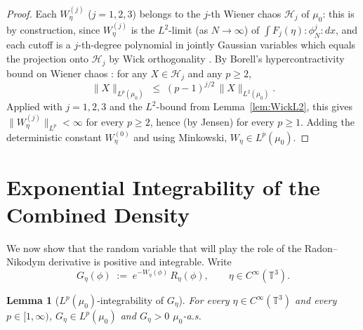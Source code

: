 \documentclass[12pt]{article}
\newtheorem{lemma}[theorem]{Lemma}
\theoremstyle{definition}
\begin{document}
\begin{proof}
Each $W_\eta^{(j)}$ ($j=1,2,3$) belongs to the $j$-th Wiener chaos $\mathcal{H}_j$ of
$\mu_0$: this is by construction, since $W_\eta^{(j)}$ is the $L^2$-limit (as $N\to\infty$)
of $\int F_j(\eta)\colon\!\phi_N^j\!\colon dx$, and each cutoff is a $j$-th-degree
polynomial in jointly Gaussian variables which equals the projection onto $\mathcal{H}_j$
by Wick orthogonality \cite[Ch.~I]{Simon}. By Borell's hypercontractivity bound on Wiener
chaos \cite{Borell}: for any $X\in\mathcal{H}_j$ and any $p\ge 2$,
\begin{equation}\label{eq:Borell}
\|X\|_{L^p(\mu_0)}\;\le\;(p-1)^{j/2}\,\|X\|_{L^2(\mu_0)}.
\end{equation}
Applied with $j=1,2,3$ and the $L^2$-bound from Lemma~\ref{lem:WickL2}, this gives
$\|W_\eta^{(j)}\|_{L^p}<\infty$ for every $p\ge 2$, hence (by Jensen) for every $p\ge 1$.
Adding the deterministic constant $W_\eta^{(0)}$ and using Minkowski,
$W_\eta\in L^p(\mu_0)$.
\end{proof}

\section{Exponential Integrability of the Combined Density}

We now show that the random variable that will play the role of the Radon--Nikodym
derivative is positive and integrable. Write
\begin{equation}\label{eq:Geta}
G_\eta(\phi) \;:=\; e^{-W_\eta(\phi)}\,R_\eta(\phi),
\qquad \eta\in C^\infty(\mathbb{T}^3).
\end{equation}

\begin{lemma}[$L^p(\mu_0)$-integrability of $G_\eta$]\label{lem:GLp}
For every $\eta\in C^\infty(\mathbb{T}^3)$ and every $p\in[1,\infty)$,
$G_\eta\in L^p(\mu_0)$ and $G_\eta>0$ $\mu_0$-a.s.
\end{lemma}
\end{document}
